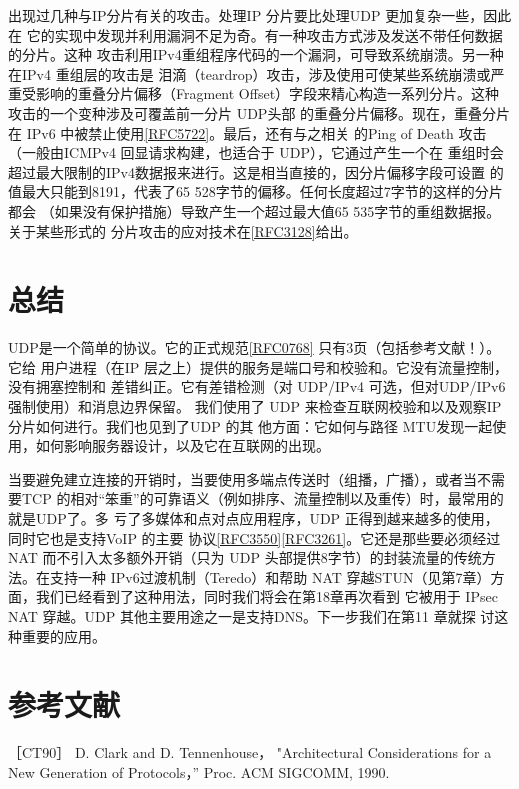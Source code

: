 出现过几种与IP分片有关的攻击。处理IP 分片要比处理UDP 更加复杂一些，因此在
它的实现中发现并利用漏洞不足为奇。有一种攻击方式涉及发送不带任何数据的分片。这种
攻击利用IPv4重组程序代码的一个漏洞，可导致系统崩溃。另一种在IPv4 重组层的攻击是
泪滴（teardrop）攻击，涉及使用可使某些系统崩溃或严重受影响的重叠分片偏移（Fragment
Offset）字段来精心构造一系列分片。这种攻击的一个变种涉及可覆盖前一分片 UDP头部
的重叠分片偏移。现在，重叠分片在 IPv6 中被禁止使用\href{https://www.rfc-editor.org/rfc/rfc5722}{[RFC5722]}。最后，还有与之相关
的Ping of Death 攻击（一般由ICMPv4 回显请求构建，也适合于 UDP），它通过产生一个在
重组时会超过最大限制的IPv4数据报来进行。这是相当直接的，因分片偏移字段可设置
的值最大只能到8191，代表了65 528字节的偏移。任何长度超过7字节的这样的分片都会
（如果没有保护措施）导致产生一个超过最大值65 535字节的重组数据报。关于某些形式的
分片攻击的应对技术在\href{https://www.rfc-editor.org/rfc/rfc3128}{[RFC3128]}给出。

\section{总结}
UDP是一个简单的协议。它的正式规范\href{https://www.rfc-editor.org/rfc/rfc0768}{[RFC0768]} 只有3页（包括参考文献！）。它给
用户进程（在IP 层之上）提供的服务是端口号和校验和。它没有流量控制，没有拥塞控制和
差错纠正。它有差错检测（对 UDP/IPv4 可选，但对UDP/IPv6强制使用）和消息边界保留。
我们使用了 UDP 来检查互联网校验和以及观察IP 分片如何进行。我们也见到了UDP 的其
他方面：它如何与路径 MTU发现一起使用，如何影响服务器设计，以及它在互联网的出现。

当要避免建立连接的开销时，当要使用多端点传送时（组播，广播），或者当不需要TCP
的相对“笨重”的可靠语义（例如排序、流量控制以及重传）时，最常用的就是UDP了。多
亏了多媒体和点对点应用程序，UDP 正得到越来越多的使用，同时它也是支持VoIP 的主要
协议\href{https://www.rfc-editor.org/rfc/rfc3550}{[RFC3550]}\href{https://www.rfc-editor.org/rfc/rfc3261}{[RFC3261]}。它还是那些要必须经过 NAT 而不引入太多额外开销（只为 UDP
头部提供8字节）的封装流量的传统方法。在支持一种 IPv6过渡机制（Teredo）和帮助 NAT
穿越STUN（见第7章）方面，我们已经看到了这种用法，同时我们将会在第18章再次看到
它被用于 IPsec NAT 穿越。UDP 其他主要用途之一是支持DNS。下一步我们在第11 章就探
讨这种重要的应用。

\section{参考文献}
［CT90］ D. Clark and D. Tennenhouse， "Architectural Considerations for a New
Generation of Protocols，” Proc. ACM SIGCOMM, 1990.

